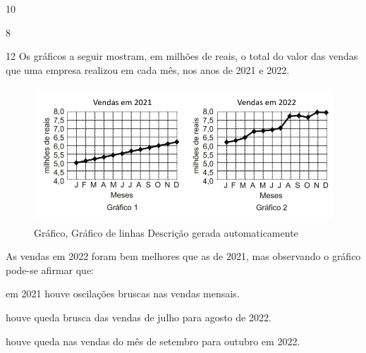 {{{\begin{escolha}
{{{{\begin{escolha}
\begin{escolha}
{\begin{escolha}
\begin{escolha}
\begin{escolha}
\begin{escolha}
\begin{escolha}
\begin{escolha}
\begin{escolha}
  \item 10

  \item 8

\end{escolha}


\num{12} Os gráficos a seguir mostram, em milhões de reais, o total do
valor das vendas que uma empresa realizou em cada mês, nos anos de 2021
e 2022.

\begin{figure}
\centering
\includegraphics[width=4.73437in,height=2.00699in]{./_SAEB_9_MAT/media/image269.png}
\caption{Gráfico, Gráfico de linhas Descrição gerada automaticamente}
\end{figure}

As vendas em 2022 foram bem melhores que as de 2021, mas observando o
gráfico pode-se afirmar que:

\begin{escolha}

  \item em 2021 houve oscilações bruscas nas vendas mensais.

  \item houve queda brusca das vendas de julho para agosto de 2022.

  \item houve queda nas vendas do mês de setembro para outubro em 2022.


\end{escolha}
\end{escolha}
\end{escolha}
\end{escolha}
\end{escolha}
\end{escolha}
\end{escolha}}
\end{escolha}
\end{escolha}}}}}
\end{escolha}}}}
